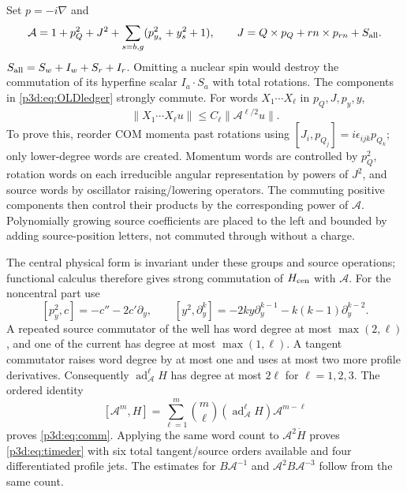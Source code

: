 \documentclass[11pt]{article}
\numberwithin{equation}{section}
\theoremstyle{definition}
\theoremstyle{remark}
\begin{document}
Set $p=-i\nabla$ and
\begin{equation}\label{p3d:eq:OLDledger}
 \mathcal A=1+p_Q^2+J^2+\sum_{s=b,g}(p_{y_s}^2+y_s^2+1),\qquad
 J=Q\times p_Q+rn\times p_{rn}+S_{\rm all}.
\end{equation}
$S_{\rm all}=S_w+I_w+S_r+I_r$. Omitting a nuclear spin would destroy
the commutation of its hyperfine scalar $I_a\cdot S_a$ with total
rotations. The components in \eqref{p3d:eq:OLDledger} strongly commute.
For words $X_1\cdots X_\ell$ in $p_Q,J,p_y,y$,
\begin{equation}\label{p3d:eq:words}
 \|X_1\cdots X_\ell u\|\leq C_\ell\|\mathcal A^{\ell/2}u\|.
\end{equation}
To prove this, reorder COM momenta past rotations using
$[J_i,p_{Q_j}]=i\epsilon_{ijk}p_{Q_k}$; only lower-degree words are created.
Momentum words are controlled by $p_Q^2$, rotation words on each
irreducible angular representation by powers of $J^2$, and source
words by oscillator raising/lowering operators. The commuting positive
components then control their products by the corresponding power of
$\mathcal A$. Polynomially growing source coefficients are placed to
the left and bounded by adding source-position letters, not commuted
through without a charge.

The central physical form is invariant under these groups and source
operations; functional calculus therefore gives strong commutation of
$H_{\rm cen}$ with $\mathcal A$. For the noncentral part use
\[
 [p_y^2,c]=-c''-2c'\partial_y,\qquad
 [y^2,\partial_y^k]=-2ky\partial_y^{k-1}
                              -k(k-1)\partial_y^{k-2}.
\]
A repeated source commutator of the well has word degree at most
$\max(2,\ell)$, and one of the current has degree at most
$\max(1,\ell)$. A tangent commutator raises word degree by at most one
and uses at most two more profile derivatives. Consequently
$\operatorname{ad}_{\mathcal A}^{\ell}H$ has degree at most $2\ell$
for $\ell=1,2,3$. The ordered identity
\[
 [\mathcal A^m,H]=
 \sum_{\ell=1}^m \binom{m}{\ell}
       (\operatorname{ad}_{\mathcal A}^{\ell}H)\mathcal A^{m-\ell}
\]
proves \eqref{p3d:eq:comm}. Applying the same word count to
$\mathcal A^2\dot H$ proves \eqref{p3d:eq:timeder} with six total
tangent/source orders available and four differentiated profile jets.
The estimates for $B\mathcal A^{-1}$ and
$\mathcal A^2B\mathcal A^{-3}$ follow from the same count.
\end{document}
